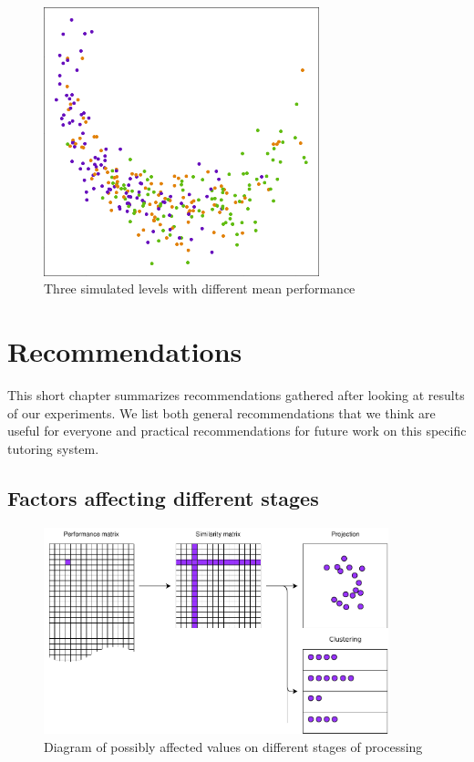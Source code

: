 \documentclass[
  printed, %
  table,   %
  nolof,     %
  nolot,     %
  color,
  final,
  nocover
]{fithesis3}
\begin{document}
\begin{figure}
  \includegraphics[width=8cm]{img/simulated_performance}
  \caption{Three simulated levels with different mean performance}
  \label{fig:simulated_performance}
\end{figure}


\chapter{Recommendations}\label{recommendations}


This short chapter summarizes recommendations gathered after looking at results of our experiments. We list both general recommendations that we think are useful for everyone and practical recommendations for future work on this specific tutoring system.


\section{Factors affecting different stages}\label{factors-affecting-different-stages}

\begin{figure}
  \includegraphics[width=10cm]{img/affected_diagram}
  \caption{Diagram of possibly affected values on different stages of processing}
  \label{fig:affected_diagram}
\end{figure}
\end{document}
